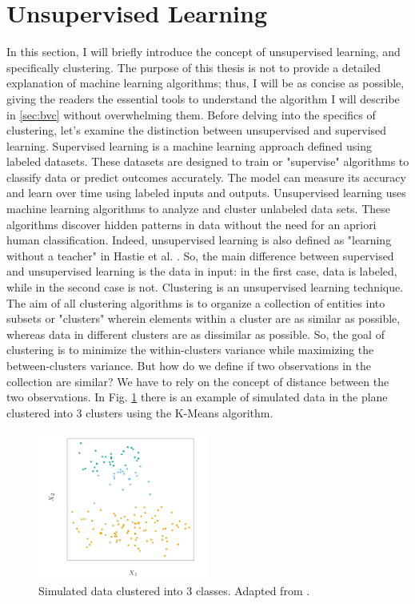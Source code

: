 \section{Unsupervised Learning}
\label{sec:clustering}
In this section, I will briefly introduce the concept of unsupervised learning, and specifically clustering. The purpose of this thesis is not to provide a detailed explanation of machine learning algorithms; thus, I will be as concise as possible, giving the readers the essential tools to understand the algorithm I will describe in \ref{sec:bvc} without overwhelming them. 
Before delving into the specifics of clustering, let's examine the distinction between unsupervised and supervised learning. Supervised learning is a machine learning approach defined using labeled datasets. These datasets are designed to train or "supervise" algorithms to classify data or predict outcomes accurately. The model can measure its accuracy and learn over time using labeled inputs and outputs. Unsupervised learning uses machine learning algorithms to analyze and cluster unlabeled data sets. These algorithms discover hidden patterns in data without the need for an apriori human classification. Indeed, unsupervised learning is also defined as "learning without a teacher" in Hastie et al. \cite{tibshirani_elements_2008}. So, the main difference between supervised and unsupervised learning is the data in input: in the first case, data is labeled, while in the second case is not. Clustering is an unsupervised learning technique.
The aim of all clustering algorithms is to organize a collection of entities into subsets or "clusters" wherein elements within a cluster are as similar as possible, whereas data in different clusters are as dissimilar as possible. So, the goal of clustering is to minimize the within-clusters variance while maximizing the between-clusters variance. But how do we define if two observations in the collection are similar? We have to rely on the concept of distance between the two observations. In Fig. \ref{fig:clustering} there is an example of simulated data in the plane clustered into 3 clusters using the K-Means algorithm.
\begin{figure}[H]
    \centering
    \includegraphics[width=0.5\textwidth]{Images/clustering.png}
    \caption[Example of clustering.]{Simulated data clustered into 3 classes. Adapted from \cite{tibshirani_elements_2008}.}
    \label{fig:clustering}
\end{figure}
